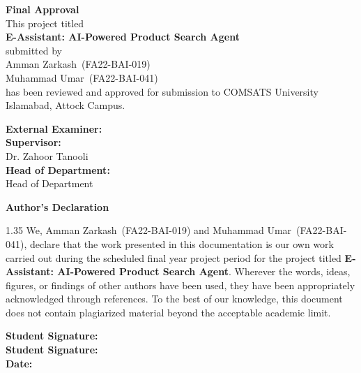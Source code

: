 \documentclass[12pt,a4paper,oneside]{report}
\newcommand{\projecttitle}{E-Assistant: AI-Powered Product Search Agent}
\newcommand{\studentone}{Amman Zarkash}
\newcommand{\studentoneid}{FA22-BAI-019}
\newcommand{\studenttwo}{Muhammad Umar}
\newcommand{\studenttwoid}{FA22-BAI-041}
\newcommand{\supervisorname}{Dr. Zahoor Tanooli}
\begin{document}
\begin{titlepage}
\centering
\vspace*{1cm}
{\LARGE \textbf{Final Approval}}\\[1cm]
This project titled\\[0.4cm]
{\Large \textbf{\projecttitle}}\\[0.9cm]
submitted by\\[0.4cm]
\studentone\ (\studentoneid)\\
\studenttwo\ (\studenttwoid)\\[1cm]
has been reviewed and approved for submission to COMSATS University Islamabad, Attock Campus.\\[1.5cm]

\begin{flushleft}
\textbf{External Examiner:} \hrulefill\\[1.0cm]
\textbf{Supervisor:} \hrulefill\\[0.2cm]
\hspace*{2.4cm}\supervisorname\\[1.0cm]
\textbf{Head of Department:} \hrulefill\\[0.2cm]
\hspace*{4cm}Head of Department
\end{flushleft}
\end{titlepage}

\begin{titlepage}
\centering
\vspace*{1cm}
{\LARGE \textbf{Author's Declaration}}\\[1cm]
\begin{spacing}{1.35}
We, \studentone\ (\studentoneid) and \studenttwo\ (\studenttwoid), declare that the work presented in this documentation is our own work carried out during the scheduled final year project period for the project titled \textbf{\projecttitle}. Wherever the words, ideas, figures, or findings of other authors have been used, they have been appropriately acknowledged through references. To the best of our knowledge, this document does not contain plagiarized material beyond the acceptable academic limit.
\end{spacing}

\vfill
\begin{flushleft}
\textbf{Student Signature:} \hrulefill\\[0.6cm]
\textbf{Student Signature:} \hrulefill\\[0.6cm]
\textbf{Date:} \hrulefill
\end{flushleft}
\end{titlepage}
\end{document}

